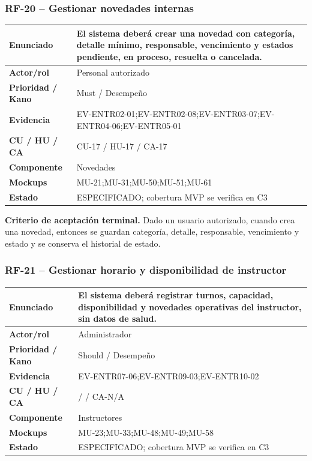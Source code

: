 \documentclass[11pt,a4paper,twoside]{article}
\begin{document}
\subsubsection{RF-20 -- Gestionar novedades internas}
\begin{tabularx}{\textwidth}{|>{\bfseries}p{3.2cm}|X|}\hline
Enunciado & El sistema deberá crear una novedad con categoría, detalle mínimo, responsable, vencimiento y estados pendiente, en proceso, resuelta o cancelada. \\ \hline
Actor/rol & Personal autorizado \\ \hline
Prioridad / Kano & Must / Desempeño \\ \hline
Evidencia & EV-ENTR02-01;EV-ENTR02-08;EV-ENTR03-07;EV-ENTR04-06;EV-ENTR05-01 \\ \hline
CU / HU / CA & CU-17 / HU-17 / CA-17 \\ \hline
Componente & Novedades \\ \hline
Mockups & MU-21;MU-31;MU-50;MU-51;MU-61 \\ \hline
Estado & ESPECIFICADO; cobertura MVP se verifica en C3 \\ \hline
\end{tabularx}
\textbf{Criterio de aceptación terminal.} Dado un usuario autorizado, cuando crea una novedad, entonces se guardan categoría, detalle, responsable, vencimiento y estado y se conserva el historial de estado.
\subsubsection{RF-21 -- Gestionar horario y disponibilidad de instructor}
\begin{tabularx}{\textwidth}{|>{\bfseries}p{3.2cm}|X|}\hline
Enunciado & El sistema deberá registrar turnos, capacidad, disponibilidad y novedades operativas del instructor, sin datos de salud. \\ \hline
Actor/rol & Administrador \\ \hline
Prioridad / Kano & Should / Desempeño \\ \hline
Evidencia & EV-ENTR07-06;EV-ENTR09-03;EV-ENTR10-02 \\ \hline
CU / HU / CA &  /  / CA-N/A \\ \hline
Componente & Instructores \\ \hline
Mockups & MU-23;MU-33;MU-48;MU-49;MU-58 \\ \hline
Estado & ESPECIFICADO; cobertura MVP se verifica en C3 \\ \hline
\end{tabularx}
\end{document}
